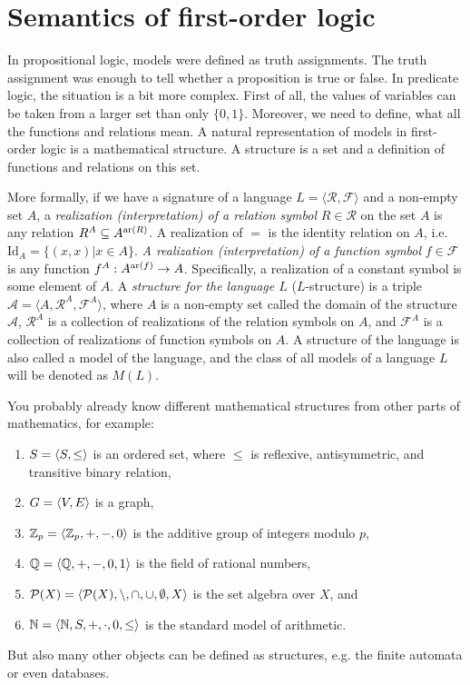 \section{Semantics of first-order logic}

In propositional logic, models were defined as truth assignments. The truth assignment was enough to tell whether a proposition is true or false. In predicate logic, the situation is a bit more complex. First of all, the values of variables can be taken from a larger set than only $\{0,1\}$. Moreover, we need to define, what all the functions and relations mean. A natural representation of models in first-order logic is a mathematical structure. A structure is a set and a definition of functions and relations on this set. 

More formally, if we have a signature of a language $L = \langle \mathcal{R}, \mathcal{F} \rangle$ and a non-empty set $A$, a \emph{realization (interpretation) of a relation symbol} $R \in \mathcal{R}$ on the set $A$ is any relation $R^A \subseteq A^{\operatorname{ar}(R)}$. A realization of $=$ is the identity relation on $A$, i.e. $\mathrm{Id}_A = \{(x, x) | x \in A\}$. \emph{A realization (interpretation) of a function symbol} $f \in \mathcal{F}$ is any function $f^A: A^{\operatorname{ar}(f)} \to A$. Specifically, a realization of a constant symbol is some element of $A$. A \emph{structure for the language $L$} ($L$-structure) is a triple $\mathcal{A} = \langle A, \mathcal{R}^A, \mathcal{F}^A \rangle$, where $A$ is a non-empty set called the domain of the structure $\mathcal{A}$, $\mathcal{R}^A$ is a collection of realizations of the relation symbols on $A$, and $\mathcal{F}^A$ is a collection of realizations of function symbols on $A$. A structure of the language is also called a model of the language, and the class of all models of a language $L$ will be denoted as $M(L)$.

You probably already know different mathematical structures from other parts of mathematics, for example:
\begin{enumerate}
	\item $S = \langle S, \leq \rangle$ is an ordered set, where $\leq$ is reflexive, antisymmetric, and transitive binary relation,
	\item $G = \langle V, E \rangle$ is a graph,
	\item $\mathbb{Z}_p = \langle \mathbb{Z}_p, +, -, 0 \rangle$ is the additive group of integers modulo $p$,
	\item $\mathbb{Q} = \langle \mathbb{Q}, +, -, 0, 1 \rangle$ is the field of rational numbers,
	\item $\mathcal{P}(X) = \langle \mathcal{P}(X), \setminus, \cap, \cup, \emptyset, X \rangle$ is the set algebra over $X$, and
	\item $\mathbb{N} = \langle \mathbb{N}, S, +, \cdot, 0, \leq \rangle$ is the standard model of arithmetic.
\end{enumerate}
But also many other objects can be defined as structures, e.g. the finite automata or even databases.

